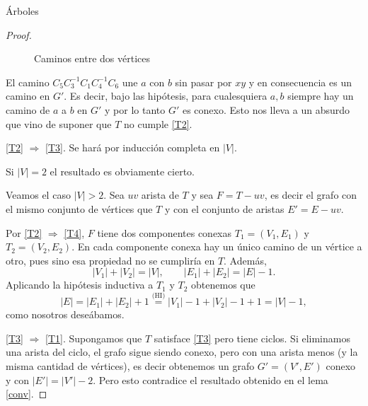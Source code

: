 \begin{section}{Árboles}
\begin{proof}
\begin{figure}[ht]
    \begin{center}
    \end{center}
    \caption{Caminos entre dos vértices} \label{fT2T3}
\end{figure}


El camino $C_5C_3^{-1}C_1C_4^{-1}C_6$ une $a$ con $b$ sin pasar por $xy$ y en consecuencia es un camino en $G'$. Es decir, bajo las hipótesis,  para cualesquiera $a,b$ siempre hay un camino de $a$ a $b$ en $G'$ y por lo tanto  $G'$ es conexo. Esto nos lleva a un absurdo que vino de suponer que $T$ no cumple \ref{T2}.




\noindent \ref{T2} $\Rightarrow$ \ref{T3}.  Se hará por inducción completa en $|V|$. 

Si $|V|=2$  el resultado es obviamente cierto. 
    
Veamos el caso $|V|>2$. Sea $uv$  arista de $T$ y sea  $F = T -uv$,  es decir el grafo con el mismo conjunto de vértices que $T$ y con el conjunto de aristas $E'=E-uv$. 

Por  \ref{T2} $\Rightarrow$ \ref{T4}, $F$ tiene dos componentes conexas   $T_1 = (V_1, E_1)$ y  $T_2 = (V_2, E_2)$. En cada componente conexa  hay un único camino de un vértice a otro, pues sino esa propiedad no se cumpliría en $T$. Además, 
$$
|V_1| + |V_2| = |V|, \qquad |E_1| + |E_2| = |E|-1.
$$
Aplicando la hipótesis inductiva a $T_1$ y $T_2$ obtenemos que
$$
|E|=|E_1| + |E_2| + 1 \stackrel{\text{(HI)}}{=} |V_1|-1 +|V_2|-1+1= |V| -1,
$$
como nosotros deseábamos. 

\noindent \ref{T3} $\Rightarrow$ \ref{T1}. Supongamos que $T$ satisface \ref{T3} pero tiene ciclos. Si eliminamos una arista del ciclo, el grafo sigue siendo conexo, pero con una arista menos (y la misma cantidad de vértices), es decir obtenemos un grafo $G' = (V',E')$  conexo y con $|E'| = |V'|-2$. Pero esto contradice el resultado obtenido en el lema \ref{conv}.    


\end{proof}
\end{section}
